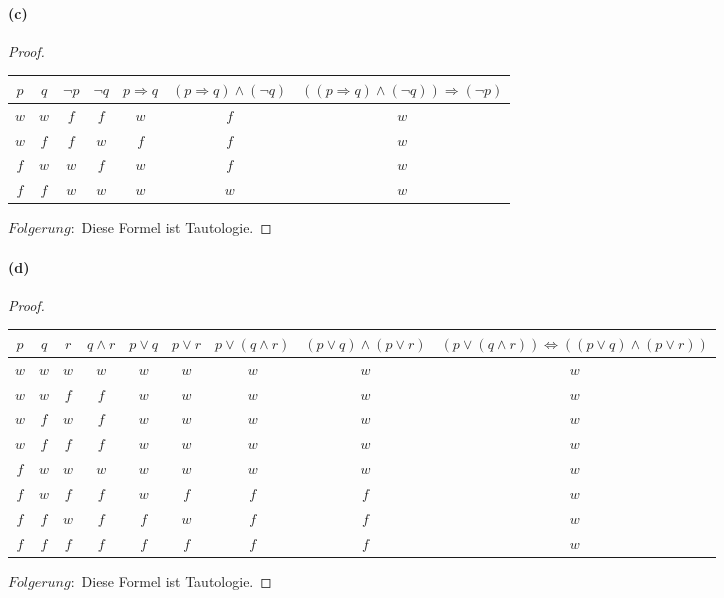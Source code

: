 \paragraph{(c)}
\begin{proof}
$ $\newline
\begin{center}
\begin{tabular}{||c|c||c|c|c|c|c||}
\hline
$p$ & $q$ & $\neg p$ & $\neg q$ & $p\Rightarrow q$ & $(p\Rightarrow q)\wedge (\neg q)$ & $((p\Rightarrow q)\wedge (\neg q))\Rightarrow (\neg p)$ \\
\hline
\hline
$w$ & $w$ & $f$ & $f$ & $w$ & $f$ & $w$ \\
$w$ & $f$ & $f$ & $w$ & $f$ & $f$ & $w$ \\
$f$ & $w$ & $w$ & $f$ & $w$ & $f$ & $w$ \\
$f$ & $f$ & $w$ & $w$ & $w$ & $w$ & $w$ \\
\hline
\end{tabular}
\end{center}
$Folgerung:$ Diese Formel ist Tautologie.
\end{proof}

\newpage

\paragraph{(d)}
\begin{proof}
$ $\newline
\begin{center}
\begin{tabular}{||c|c|c||c|c|c|c|c|c||}
\hline
$p$ & $q$ & $r$ & $q\wedge r$ & $p\vee q$ & $p\vee r$ & $p\vee (q\wedge r)$ & $(p\vee q)\wedge (p\vee r)$ & $(p\vee (q\wedge r))\Leftrightarrow ((p\vee q)\wedge (p\vee r))$ \\
\hline
\hline
$w$ & $w$ & $w$ & $w$ & $w$ & $w$ & $w$ & $w$ & $w$ \\

$w$ & $w$ & $f$ & $f$ & $w$ & $w$ & $w$ & $w$ & $w$ \\

$w$ & $f$ & $w$ & $f$ & $w$ & $w$ & $w$ & $w$ & $w$ \\

$w$ & $f$ & $f$ & $f$ & $w$ & $w$ & $w$ & $w$ & $w$ \\

$f$ & $w$ & $w$ & $w$ & $w$ & $w$ & $w$ & $w$ & $w$ \\

$f$ & $w$ & $f$ & $f$ & $w$ & $f$ & $f$ & $f$ & $w$ \\

$f$ & $f$ & $w$ & $f$ & $f$ & $w$ & $f$ & $f$ & $w$ \\

$f$ & $f$ & $f$ & $f$ & $f$ & $f$ & $f$ & $f$ & $w$ \\
\hline
\end{tabular}
\end{center}
$Folgerung:$ Diese Formel ist Tautologie.
\end{proof}

